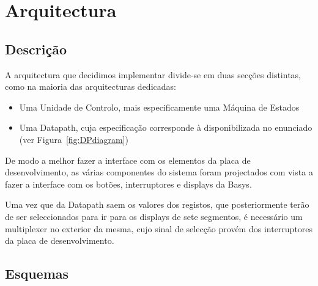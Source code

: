 \documentclass[a4paper]{article}
\begin{document}


\tableofcontents
\pagebreak

\section{Arquitectura}
\subsection{Descrição}
A arquitectura que decidimos implementar divide-se em duas secções distintas, como na maioria das arquitecturas dedicadas:
\begin{itemize}
\item Uma Unidade de Controlo, mais especificamente uma Máquina de Estados
\item Uma Datapath, cuja especificação corresponde à disponibilizada no enunciado (ver Figura~\ref{fig:DPdiagram})
\end{itemize}

De modo a melhor fazer a interface com os elementos da placa de desenvolvimento, as várias componentes do sistema foram projectados com vista a fazer a interface com os botões, interruptores e displays da Basys.

Uma vez que da Datapath saem os valores dos registos, que posteriormente terão de ser seleccionados para ir para os displays de sete segmentos, é necessário um multiplexer no exterior da mesma, cujo sinal de selecção provém dos interruptores da placa de desenvolvimento.

\pagebreak
\subsection{Esquemas}
\end{document}
